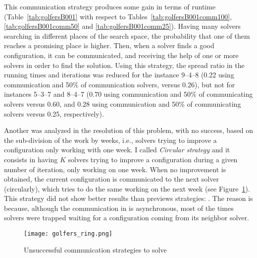This communication strategy produces some gain in terms of runtime (Table~\ref{tab:golfersB001} with respect to Tables~\ref{tab:golfersB001comm100}, \ref{tab:golfersB001comm50} and \ref{tab:golfersB001comm25}). 
Having many solvers searching in different places of the search space, the probability that one of them reaches a promising place is higher. Then, when a solver finds a good configuration, it can be communicated, and receiving the help of one or more solvers in order to find the solution.
Using this strategy, the spread ratio in the running times and iterations  was reduced for the instance 9--4--8 (0.22 using communication \oneTone{} and 50\% of communication solvers, versus 0.26), but not for instances 5--3--7 and 8--4--7 (0.70 using communication \oneTn{} and 50\% of communicating solvers versus 0.60, and 0.28 using communication \oneTone{} and 50\% of communicating solvers versus 0.25, respectively).


Another \commstr{} was analyzed in the resolution of this problem, with no success, based on the sub-division of the work by weeks, i.e., solvers trying to improve a configuration only working with one week. I called \textit{Circular strategy}  and it consists in having $K$ solvers trying to improve a configuration during a given number of iteration, only working on one week. When no improvement is obtained, the current configuration is communicated to the next solver (circularly), which tries to do the same working on the next week (see Figure~\ref{subfig:golfers_bad_ring}).
This strategy did not show better results than previews strategies: . The reason is because, although the communication in \posl{} is asynchronous, most of the times solvers were trapped waiting for a configuration coming from its neighbor solver.

\begin{figure}[h]
\centering
\texttt{[image: golfers\_ring.png]}	
\caption[]{Unsuccessful communication strategies to solve \SGP}
\label{subfig:golfers_bad_ring}
\end{figure}

